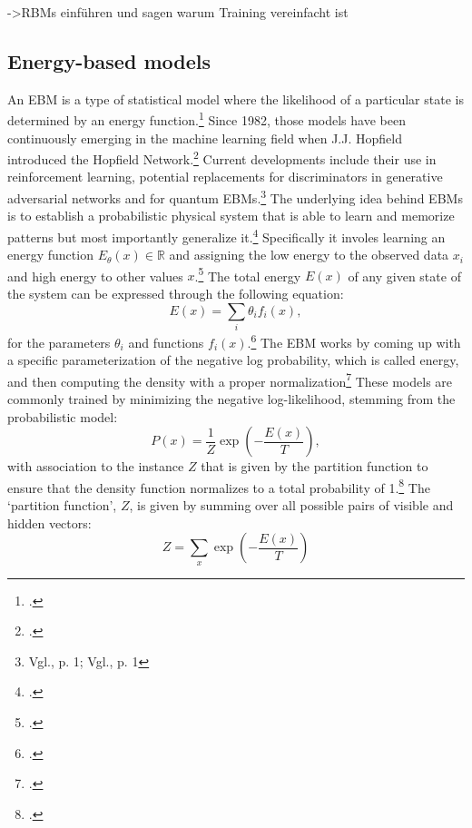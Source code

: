 ->RBMs einführen und sagen warum Training vereinfacht ist

\subsection{Energy-based models}


An \ac{EBM} is a type of statistical model where the likelihood of a particular state is determined by an energy function.\footcite[Vgl.][2]{huembeliPhysicsEnergybasedModels2022}
Since 1982, those models have been continuously emerging in the machine learning field when J.J. Hopfield introduced the Hopfield Network.\footcite[Vgl.][]{hopfieldNeuralNetworksPhysical1982}
Current developments include their use in reinforcement learning, potential replacements for discriminators in generative adversarial networks and for quantum \ac{EBM}s.\footnote{Vgl.\cite{verdonQuantumHamiltonianBasedModels2019}, p. 1; Vgl.\cite{duModelBasedPlanning2021}, p. 1}
The underlying idea behind \ac{EBM}s is to establish a probabilistic physical system that is able to learn and memorize patterns but most importantly generalize it.\footcite[Vgl.][2]{huembeliPhysicsEnergybasedModels2022} 
Specifically it involes learning an energy function \(E_{\theta}(x) \in \mathbb{R}\) and assigning the low energy to the observed data \(x_i\) and high energy to other values \(x\).\footcite[Vgl.][330]{gustafssonEnergyBasedModelsDeep2020}
The total energy \( E(x) \) of any given state of the system can be expressed through the following equation: 
\begin{equation}
    E(x) = \sum_i \theta_i f_i(x),
\end{equation}
for the parameters $\theta_i$ and functions $f_i(x)$.\footcite[Vgl.][3]{hintonPracticalGuideTraining2012}
The \ac{EBM} works by coming up with a specific parameterization of the negative log probability, which is called energy, and then computing the density with a proper normalization\footcite[Vgl.][2]{zhaiDeepStructuredEnergy2016}
These models are commonly trained by minimizing the negative log-likelihood, stemming from the probabilistic model:
\begin{equation}
    P(x) = \frac{1}{Z} \exp\left(-\frac{E(x)}{T}\right),
\end{equation}
with association to the instance \( Z \) 
that is given by the partition function to ensure that the density function normalizes to a total probability of 1.\footcite[Vgl.][2]{zhaiDeepStructuredEnergy2016}
The `partition function', \( Z \), is given by summing over all possible pairs of visible and hidden vectors:
\begin{equation}
    Z = \sum_x \exp\left(-\frac{E(x)}{T}\right)
\end{equation}

